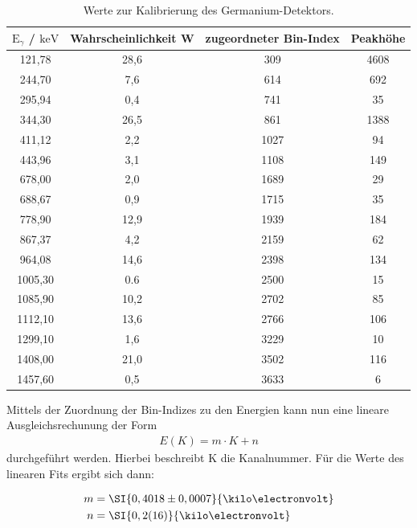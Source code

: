 \begin{table}
    \centering
    \caption{Werte zur Kalibrierung des Germanium-Detektors.}
    \label{tab:Kali}
    \begin{tabular}{ c c c c }
        \toprule
        {$\text{E}_{\gamma}$ / $\si{\kilo \electronvolt}$} & { Wahrscheinlichkeit W} & {zugeordneter Bin-Index} & {Peakhöhe}     \\
        \midrule
        121,78 &    28,6 &  309  & 4608 \\
        244,70 &     7,6 &   614  & 692 \\
        295,94 &    0,4 &   741  & 35 \\
        344,30 &     26,5 &  861  & 1388 \\
        411,12 &    2,2 &   1027 & 94 \\
        443,96 &    3,1 &   1108 & 149 \\
        678,00 &     2,0 &   1689 & 29 \\
        688,67 &    0,9 &   1715 & 35 \\
        778,90 &     12,9 &  1939 & 184 \\
        867,37 &    4,2 &   2159 & 62 \\
        964,08 &    14,6 &  2398 & 134 \\
        1005,30 &    0.6 &   2500 & 15 \\
        1085,90 &    10,2 &  2702 & 85 \\
        1112,10 &    13,6 &  2766 & 106 \\
        1299,10 &    1,6 &   3229 & 10 \\
        1408,00 &    21,0 &  3502 & 116 \\
        1457,60 &    0,5 &   3633 &   6 \\
        \bottomrule
    \end{tabular}
\end{table}
\FloatBarrier

\noindent Mittels der Zuordnung der Bin-Indizes zu den Energien kann nun eine lineare Ausgleichsrechunung der Form
\begin{align*}
    E(K) = m \cdot K + n
\end{align*}
durchgeführt werden. Hierbei beschreibt K die Kanalnummer.
Für die Werte des linearen Fits ergibt sich dann:

\begin{align*}
    m &= \SI{0,4018 \pm 0,0007}{\kilo \electronvolt} \\
    n &= \SI{0,2(16)}{\kilo \electronvolt}
\end{align*}

